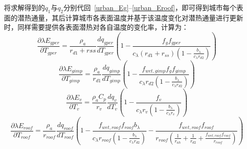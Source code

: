 将求解得到的$q_{1}$与$q_{2}$分别代回~\ref{urban_Eg}--\ref{urban_Eroof}，即可得到城市每个表面的潜热通量，其后计算城市各表面温度并基于该温度变化对潜热通量进行更新时，同样需要提供各表面潜热对各自温度的变化率，计算为：
\begin{equation}
\frac{\partial \lambda E_{gper}}{\partial T_{gper}} = \frac{\rho _a}{r_{d1}+rss} \frac{dq_{gper}}{dT_{gper}} \left(1-\frac{f_{g}f_{gper}}{c_{\lambda} \left(r_{d1}+r_{ss}\right) \left(1-\frac{b_{\lambda}}{c_{\lambda} r_{d2}}\right)}\right)
\end{equation}
%
\begin{equation}
\frac{\partial \lambda E_{gimp}}{\partial T_{gimp}} = \frac{\rho _a}{r_{d1}} \frac{dq_{gimp}}{dT_{gimp}} \left(1-\frac{f_{wet,gimp} f_{g} f_{gimp}}{c_{\lambda} r_{d2}\left(1-\frac{b_{\lambda}}{c_{\lambda} r_{d2}}\right)}\right)
\end{equation}
%
\begin{equation}
\frac{\partial \lambda E_{v}}{\partial T_{v}} = \frac{\rho _a C_p}{r_{v}} \frac{dq_{v}}{dT_{v}} \left(1-\frac{f_{v}}{c_{\lambda} r_{v}\left(1-\frac{b_{\lambda}}{c_{\lambda} r_{v}}\right)}\right)
\end{equation}
%
\begin{equation}
\frac{\partial \lambda E_{roof}}{\partial T_{roof}} = \frac{\rho _a}{r_{roof}} \frac{dq_{roof}}{dT_{roof}} \left(1-\frac{f_{wet,roof}f_{roof} b_{\lambda}}{c_{\lambda} r_{roof} \left(1-\frac{b_{\lambda}}{c_{\lambda} r_{d2}}\right)}-\frac{f_{wet,roof}f_{roof}}{r_{roof}\left(\frac{1}{r_{ah}}+\frac{1}{r_{d2}}+\frac{f_{wet,roof} f_{roof}}{r_{roof}}\right)}\right)
\end{equation}